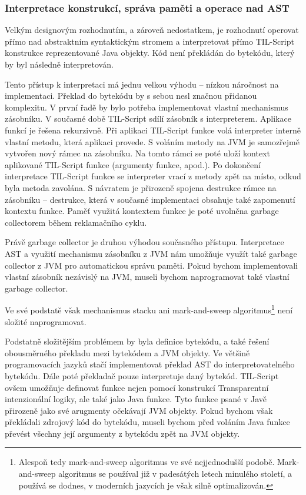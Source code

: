 \subsubsection{Interpretace konstrukcí, správa paměti a operace nad AST}

Velkým designovým rozhodnutím, a zároveň nedostatkem, je rozhodnutí operovat přímo nad abstraktním
syntaktickým stromem a interpretovat přímo TIL-Script konstrukce reprezentované Java objekty. Kód
není překládán do bytekódu, který by byl následně interpretován.

Tento přístup k interpretaci má jednu velkou výhodu -- nízkou náročnost na implementaci. Překlad
do bytekódu by s sebou nesl značnou přidanou komplexitu. V první řadě by bylo potřeba implementovat
vlastní mechanismus zásobníku. V současné době TIL-Script sdílí zásobník s interpreterem. Aplikace
funkcí je řešena rekurzivně. Při aplikaci TIL-Script funkce volá interpreter interně vlastní metodu,
která aplikaci provede. S voláním metody na JVM je samozřejmě vytvořen nový rámec na zásobníku.
Na tomto rámci se poté uloží kontext aplikované TIL-Script funkce (argumenty funkce, apod.).
Po dokončení interpretace TIL-Script funkce se interpreter vrací z metody zpět na místo, odkud byla
metoda zavolána. S návratem je přirozeně spojena destrukce rámce na zásobníku -- destrukce, která
v současné implementaci obsahuje také zapomenutí kontextu funkce. Paměť využitá kontextem funkce
je poté uvolněna garbage collectorem během reklamačního cyklu.

Právě garbage collector je druhou výhodou současného přístupu. Interpretace AST a využití mechanismu
zásobníku z JVM nám umožňuje využít také garbage collector z JVM pro automatickou správu paměti.
Pokud bychom implementovali vlastní zásobník nezávislý na JVM, museli bychom naprogramovat také
vlastní garbage collector.

Ve své podstatě však mechanismus stacku ani mark-and-sweep algoritmus\footnote{Alespoň tedy
  mark-and-sweep algoritmus ve své nejjednodušší podobě. Mark-and-sweep algoritmus se používal již
  v padesátých letech minulého století, a používá se dodnes, v moderních jazycích je však silně
  optimalizován.} není složité naprogramovat.

Podstatně složitějším problémem by byla definice bytekódu, a také řešení obousměrného překladu mezi
bytekódem a JVM objekty. Ve většině programovacích jazyků stačí implementovat překlad AST
do interpretovatelného bytekódu. Dále poté překladač pouze interpretuje daný bytekód. TIL-Script
ovšem umožňuje definovat funkce nejen pomocí konstrukcí Transparentní intenzionální logiky, ale také
jako Java funkce. Tyto funkce psané v Javě přirozeně jako své arugmenty očekávají JVM objekty.
Pokud bychom však překládali zdrojový kód do bytekódu, museli bychom před voláním Java funkce
převést všechny její argumenty z bytekódu zpět na JVM objekty.


